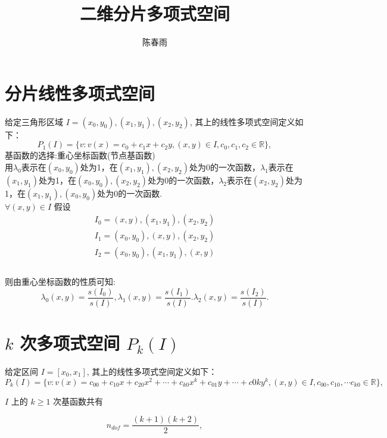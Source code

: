 \documentclass{article}
\begin{document}
\title{二维分片多项式空间}
\author{陈春雨}
\date{\chntoday}
\maketitle
\section{分片线性多项式空间}
给定三角形区域 $I = (x_0, y_0),(x_1,y_1),(x_2,y_2)$, 其上的线性多项式空间定义如下：
\begin{equation}
    P_1(I) = \{v: v(x) = c_0 + c_1 x + c_2 y, (x,y)\in I, c_0, c_1 ,c_2\in \mathbb R\},
\end{equation}
基函数的选择:重心坐标函数(节点基函数)\\

用$\lambda_0$表示在$(x_0,y_0)$处为1，在$(x_1,y_1),(x_2,y_2)$处为0的一次函数，$\lambda_1$表示在$(x_1,y_1)$处为1，在$(x_0,y_0),(x_2,y_2)$处为0的一次函数，$\lambda_2$表示在$(x_2,y_2)$处为1，在$(x_1,y_1),(x_0,y_0)$处为0的一次函数.\\

$\forall(x,y)\in I$ 假设
\begin{align*}
I_0 = (x, y),(x_1,y_1),(x_2,y_2)\\
I_1 = (x_0, y_0),(x,y),(x_2,y_2)\\
I_2 = (x_0, y_0),(x_1,y_1),(x,y)\\
\end{align*}\\
则由重心坐标函数的性质可知:
\begin{equation}
    \lambda_0(x,y) = \frac{s(I_0)}{s(I)}, \lambda_1(x,y) = \frac{s(I_1)}{s(I)}. \lambda_2(x,y) = \frac{s(I_2)}{s(I)}.
\end{equation}

\section{$k$ 次多项式空间 $P_k(I)$}

给定区间 $I = [x_0, x_1]$, 其上的线性多项式空间定义如下：
\begin{equation}
    P_k(I) = \{v: v(x) = c_{00} + c_{10} x + c_{20} x^2 + \cdots + c_{k0} x^k + c_{01} y+ \cdots +c{0k}y^k, (x,y)\in I, c_{00}, c_{10},
    \cdots c_{k0} \in \mathbb R\},
\end{equation}

$I$ 上的 $ k\geq 1 $ 次基函数共有 

\[
n_{dof} = \frac{(k+1)(k+2)}{2},
\]
\end{document}
